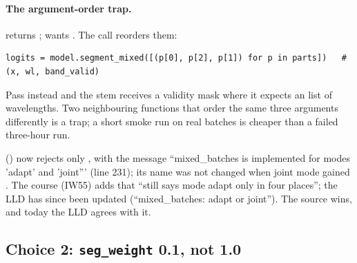 
\paragraph{The argument-order trap.}  returns ;  wants
. The call reorders them:
\begin{lstlisting}
logits = model.segment_mixed([(p[0], p[2], p[1]) for p in parts])   # (x, wl, band_valid)
\end{lstlisting}
Pass  instead and the stem receives a  validity mask where it expects an  list of wavelengths. Two neighbouring
functions that order the same three arguments differently is a trap; a short smoke run on real batches is cheaper than a failed three-hour run.

\begin{sourcenote}
 () now rejects only , with the
message ``mixed\_batches is implemented for modes 'adapt' and 'joint''' (line 231); its name was not changed when joint mode gained .
The course (IW55) adds that  ``still says mode adapt only in four places''; the LLD has since been updated (``mixed\_batches:
adapt or joint''). The source wins, and today the LLD agrees with it.
\end{sourcenote}

\subsection{Choice 2: \texttt{seg\_weight} 0.1, not 1.0}

